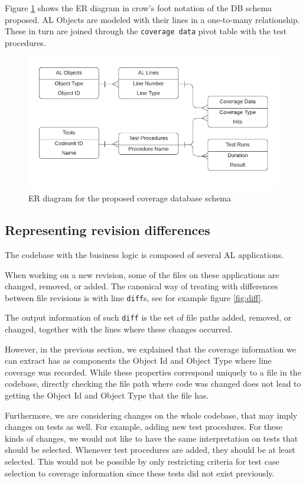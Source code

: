 \documentclass{article}
\begin{document}
Figure \ref{fig:erdiagram} shows the ER diagram in crow's foot notation of the DB schema proposed. AL Objects are modeled with their lines in a one-to-many relationship. These in turn are joined through the \texttt{coverage data} pivot table with the test procedures.
\begin{figure}[H]
  \includegraphics[width=\textwidth]{images/erdiagram.png}
  \caption{ER diagram for the proposed coverage database schema}\label{fig:erdiagram}
\end{figure}

\subsection{Representing revision differences}\label{section:rev-diffs}

The codebase with the business logic is composed of several AL applications.

When working on a new revision, some of the files on these applications are changed, removed, or added. The canonical way of treating with differences between file revisions is with line \texttt{diff}s, see for example figure \ref{fig:diff}.

The output information of such \texttt{diff} is the set of file paths added, removed, or changed, together with the lines where these changes occurred.

However, in the previous section, we explained that the coverage information we can extract has as components the Object Id and Object Type where line coverage was recorded. While these properties correspond uniquely to a file in the codebase, directly checking the file path where code was changed does not lead to getting the Object Id and Object Type that the file has.

Furthermore, we are considering changes on the whole codebase, that may imply changes on tests as well. For example, adding new test procedures. For these kinds of changes, we would not like to have the same interpretation on tests that should be selected. Whenever test procedures are added, they should be at least selected. This would not be possible by only restricting criteria for test case selection to coverage information since these tests did not exist previously.
\end{document}
